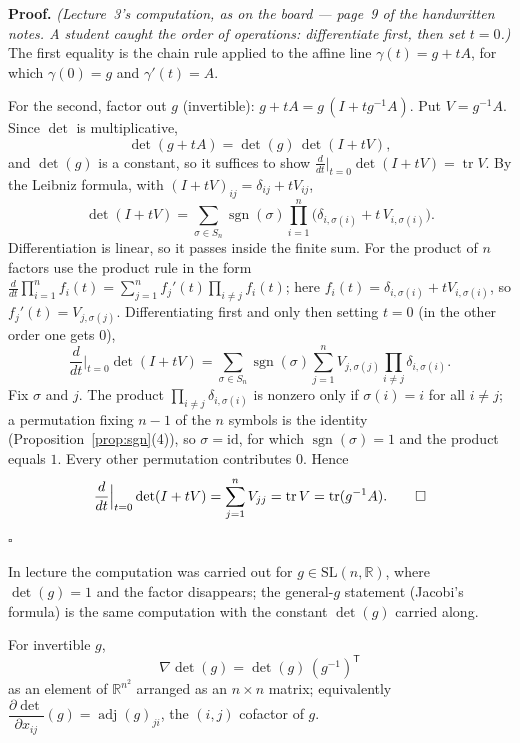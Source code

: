 \documentclass[11pt]{report}
\makeatletter
\newcounter{thmcounter}[section]
\renewenvironment{proof}[1][Proof]{\noindent\textbf{#1.} }{\hfill$\square$\par\vspace{5pt}}
\newcommand{\thmlabel}[1]{\edef\@currentlabel{\arabic{section}.\arabic{thmcounter}}\label{#1}}
\newcommand{\SL}{\mathrm{SL}}
\DeclareMathOperator{\tr}{tr}
\DeclareMathOperator{\adj}{adj}
\DeclareMathOperator{\sgn}{sgn}
\newcommand{\leeref}[1]{\par\smallskip{\raggedleft\footnotesize\textsc{Lee}:\ #1\par}}
\makeatother
\begin{document}
\begin{proof}
\textit{(Lecture~3's computation, as on the board --- page~9 of the handwritten notes. A student caught the order of operations: differentiate first, then set $t = 0$.)} The first equality is the chain rule applied to the affine line $\gamma(t) = g + tA$, for which $\gamma(0) = g$ and $\gamma'(t) = A$.

For the second, factor out $g$ (invertible): $g + tA = g\,(I + t g^{-1} A)$. Put $V = g^{-1}A$. Since $\det$ is multiplicative,
\[
\det(g + tA) = \det(g)\, \det(I + tV),
\]
and $\det(g)$ is a constant, so it suffices to show $\frac{d}{dt}\big|_{t=0} \det(I + tV) = \tr V$. By the Leibniz formula, with $(I + tV)_{ij} = \delta_{ij} + t V_{ij}$,
\[
\det(I + tV) = \sum_{\sigma \in S_n} \sgn(\sigma) \prod_{i=1}^n \big( \delta_{i,\sigma(i)} + t\, V_{i,\sigma(i)} \big).
\]
Differentiation is linear, so it passes inside the finite sum. For the product of $n$ factors use the product rule in the form $\frac{d}{dt} \prod_{i=1}^n f_i(t) = \sum_{j=1}^n f_j'(t) \prod_{i \neq j} f_i(t)$; here $f_i(t) = \delta_{i,\sigma(i)} + t V_{i,\sigma(i)}$, so $f_j'(t) = V_{j,\sigma(j)}$. Differentiating first and only then setting $t = 0$ (in the other order one gets $0$),
\[
\frac{d}{dt}\Big|_{t=0} \det(I + tV) = \sum_{\sigma \in S_n} \sgn(\sigma) \sum_{j=1}^n V_{j,\sigma(j)} \prod_{i \neq j} \delta_{i,\sigma(i)}.
\]
Fix $\sigma$ and $j$. The product $\prod_{i \neq j} \delta_{i,\sigma(i)}$ is nonzero only if $\sigma(i) = i$ for all $i \neq j$; a permutation fixing $n-1$ of the $n$ symbols is the identity (Proposition~\ref{prop:sgn}(4)), so $\sigma = \mathrm{id}$, for which $\sgn(\sigma) = 1$ and the product equals $1$. Every other permutation contributes $0$. Hence
\[
\frac{d}{dt}\Big|_{t=0} \det(I + tV) = \sum_{j=1}^n V_{jj} = \tr V = \tr(g^{-1}A). \qedhere
\]
\end{proof}

In lecture the computation was carried out for $g \in \SL(n,\mathbb{R})$, where $\det(g) = 1$ and the factor disappears; the general-$g$ statement (Jacobi's formula) is the same computation with the constant $\det(g)$ carried along.

\begin{corbox}\thmlabel{cor:jacobi-gradient}
For invertible $g$,
\[
\nabla\det(g) = \det(g)\,(g^{-1})^{\mathsf T}
\]
as an element of $\mathbb{R}^{n^2}$ arranged as an $n \times n$ matrix; equivalently $\dfrac{\partial \det}{\partial x_{ij}}(g) = \adj(g)_{ji}$, the $(i,j)$ cofactor of $g$.
\leeref{Problem 7-4}
\end{corbox}
\end{document}
